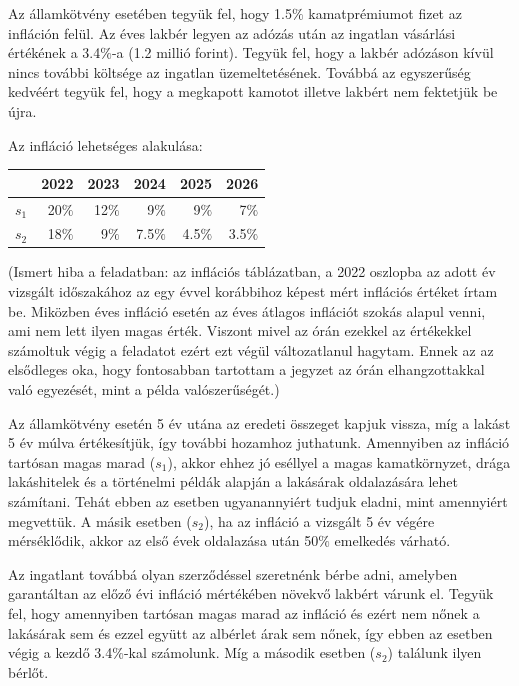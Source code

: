 \documentclass[a4paper,12pt]{article}
\begin{document}
Az államkötvény esetében tegyük fel, hogy 1.5$\%$ kamatprémiumot fizet az infláción felül. Az éves lakbér legyen az adózás után az ingatlan vásárlási értékének a 3.4$\%$-a (1.2 millió forint). Tegyük fel, hogy a lakbér adózáson kívül nincs további költsége az ingatlan üzemeltetésének. Továbbá az egyszerűség kedvéért tegyük fel, hogy a megkapott kamotot illetve lakbért nem fektetjük be újra.

Az infláció lehetséges alakulása:
\begin{center}
\begin{tabular}{c||r|r|r|r|r}
      & 2022& 2023  & 2024  & 2025 & 2026 \\
 \hline
 $s_1$&20$\%$&12$\%$&9$\%$  & 9$\%$ & 7$\%$ \\
 $s_2$&18$\%$&9$\%$ &7.5$\%$& 4.5$\%$ & 3.5$\%$ \\

\end{tabular}
\end{center}
(Ismert hiba a feladatban: az inflációs táblázatban, a 2022 oszlopba az adott év vizsgált időszakához az egy évvel korábbihoz képest mért inflációs értéket írtam be. Miközben éves infláció esetén az éves átlagos inflációt szokás alapul venni, ami nem lett ilyen magas érték. Viszont mivel az órán ezekkel az értékekkel számoltuk végig a feladatot ezért ezt végül változatlanul hagytam. Ennek az az elsődleges oka, hogy fontosabban tartottam a jegyzet az órán elhangzottakkal való egyezését, mint a példa valószerűségét.)

Az államkötvény esetén 5 év utána az eredeti összeget kapjuk vissza, míg a lakást 5 év múlva értékesítjük, így további hozamhoz juthatunk. Amennyiben az infláció tartósan magas marad ($s_1$), akkor ehhez jó eséllyel a magas kamatkörnyzet, drága lakáshitelek és a történelmi példák alapján a lakásárak oldalazására lehet számítani. Tehát ebben az esetben ugyanannyiért tudjuk eladni, mint amennyiért megvettük. A másik esetben ($s_2$), ha az infláció a vizsgált 5 év végére mérséklődik, akkor az első évek oldalazása után 50$\%$ emelkedés várható.

Az ingatlant továbbá olyan szerződéssel szeretnénk bérbe adni, amelyben garantáltan az előző évi infláció mértékében növekvő lakbért várunk el. Tegyük fel, hogy amennyiben tartósan magas marad az infláció és ezért nem nőnek a lakásárak sem és ezzel együtt az albérlet árak sem nőnek, így ebben az esetben végig a kezdő 3.4$\%$-kal számolunk. Míg a második esetben ($s_2$) találunk ilyen bérlőt.
\end{document}
